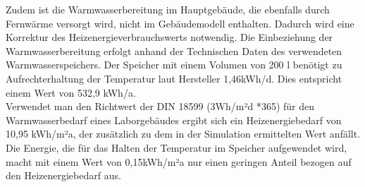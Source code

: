 Zudem ist die Warmwasserbereitung im Hauptgebäude, die ebenfalls durch Fernwärme versorgt wird, nicht im Gebäudemodell enthalten. Dadurch wird eine Korrektur des Heizenergieverbrauchswerts notwendig. Die Einbeziehung der Warmwasserbereitung erfolgt anhand der Technischen Daten des verwendeten Warmwasserspeichers. Der Speicher mit einem Volumen von 200 l benötigt zu Aufrechterhaltung der Temperatur laut Hersteller 1,46kWh/d. Dies entspricht einem Wert von 532,9 kWh/a.\\
Verwendet man den Richtwert der DIN 18599 (3Wh/m²d *365) für den Warmwasserbedarf eines Laborgebäudes ergibt sich ein Heizenergiebedarf von 10,95 kWh/m²a, der zusätzlich zu dem in der Simulation ermittelten Wert anfällt. Die Energie, die für das Halten der Temperatur im Speicher aufgewendet wird, macht mit einem Wert von 0,15kWh/m²a nur einen geringen Anteil bezogen auf den Heizenergiebedarf aus.